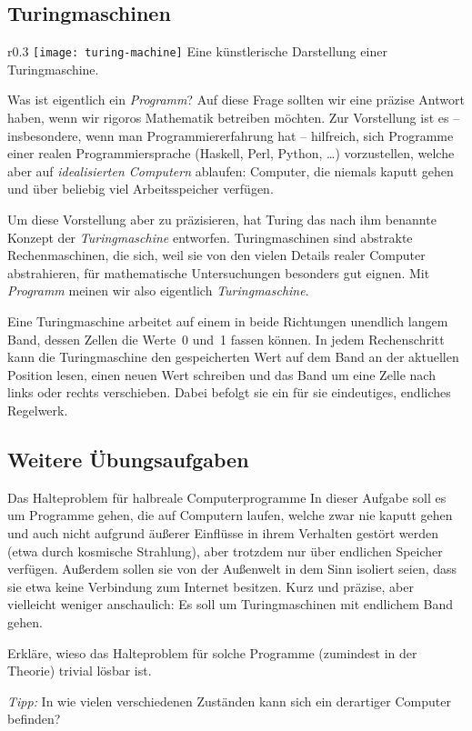 \documentclass[twoside]{../zirkelblatt1415}
\theoremstyle{definition}
\theoremstyle{plain}
\theoremstyle{remark}
\begin{document}
\newpage
\subsection{Turingmaschinen}

\setlength{\wrapoverhang}{1cm}
\setlength{\columnsep}{0.5cm}
\begin{wrapfigure}{r}{0.3\textwidth}
  \vspace{-3em}
  \texttt{[image: turing-machine]}
  \scriptsize
  Eine künstlerische Darstellung einer
  Turingmaschine.\footnotemark
\end{wrapfigure}

Was ist eigentlich ein \emph{Programm}? Auf diese Frage sollten wir eine
präzise Antwort haben, wenn wir rigoros Mathematik betreiben möchten. Zur
Vorstellung ist es -- insbesondere, wenn man Programmiererfahrung hat --
hilfreich, sich Programme einer realen Programmiersprache (Haskell, Perl,
Python, \ldots) vorzustellen, welche aber auf \emph{idealisierten Computern}
ablaufen: Computer, die niemals kaputt gehen und über beliebig viel
Arbeitsspeicher verfügen.

Um diese Vorstellung aber zu präzisieren, hat Turing das nach ihm benannte
Konzept der \emph{Turingmaschine} entworfen. Turingmaschinen sind abstrakte
Rechenmaschinen, die sich, weil sie von den vielen Details realer Computer
abstrahieren, für mathematische Untersuchungen besonders gut eignen. Mit
\emph{Programm} meinen wir also eigentlich \emph{Turingmaschine}.

Eine Turingmaschine arbeitet auf einem in beide Richtungen unendlich langem
Band, dessen Zellen die Werte~0 und~1 fassen können.
In jedem Rechenschritt kann die
Turingmaschine den gespeicherten Wert auf dem Band an der aktuellen Position
lesen, einen neuen Wert schreiben und das Band um eine Zelle nach links oder
rechts verschieben. Dabei befolgt sie ein für sie eindeutiges, endliches
Regelwerk.


\subsection{Weitere Übungsaufgaben}

\begin{aufgabe}{Das Halteproblem für halbreale Computerprogramme}
In dieser Aufgabe soll es um Programme gehen, die auf Computern laufen, welche
zwar nie kaputt gehen und auch nicht aufgrund äußerer Einflüsse in ihrem
Verhalten gestört werden (etwa durch kosmische Strahlung), aber trotzdem nur
über endlichen Speicher verfügen. Außerdem sollen sie von der Außenwelt in dem
Sinn isoliert seien, dass sie etwa keine Verbindung zum Internet besitzen.
Kurz und präzise, aber vielleicht weniger anschaulich: Es soll um
Turingmaschinen mit endlichem Band gehen.

Erkläre, wieso das Halteproblem für solche Programme (zumindest in der
Theorie) trivial lösbar ist.

\emph{Tipp:} In wie vielen verschiedenen Zuständen kann sich ein derartiger
Computer befinden?
\end{aufgabe}
\end{document}
